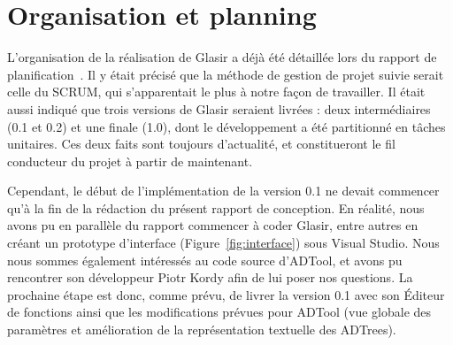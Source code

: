 \section{Organisation et planning}
    \label{sec:orga}

    L'organisation de la réalisation de Glasir a déjà été détaillée lors du rapport de planification~\cite{planif}. Il y était précisé que la méthode de gestion de projet suivie serait celle du SCRUM, qui s'apparentait le plus à notre façon de travailler. Il était aussi indiqué que trois versions de Glasir seraient livrées : deux intermédiaires (0.1 et 0.2) et une finale (1.0), dont le développement a été partitionné en tâches unitaires. Ces deux faits sont toujours d'actualité, et constitueront le fil conducteur du projet à partir de maintenant. 

    Cependant, le début de l'implémentation de la version 0.1 ne devait commencer qu'à la fin de la rédaction du présent rapport de conception. En réalité, nous avons pu en parallèle du rapport commencer à coder Glasir, entre autres en créant un prototype d'interface ({\sc Figure}~\ref{fig:interface}) sous Visual Studio. Nous nous sommes également intéressés au code source d'ADTool, et avons pu rencontrer son développeur Piotr {\sc Kordy} afin de lui poser nos questions. La prochaine étape est donc, comme prévu, de livrer la version 0.1 avec son Éditeur de fonctions ainsi que les modifications prévues pour ADTool (vue globale des paramètres et amélioration de la représentation textuelle des ADTrees).